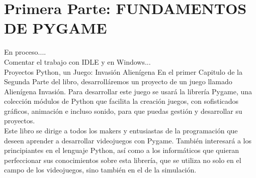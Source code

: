 










\newpage

\setcounter{page}{1}
\pagestyle{plain}




\chapter*{Primera Parte:  FUNDAMENTOS DE PYGAME}%

En proceso....
\\
Comentar el trabajo con IDLE y en Windows...\\





Proyectos  Python, un Juego: Invasión Alienígena
En el primer Capitulo de la Segunda Parte del libro, desarrolláremos  un proyecto de un juego llamado Alienígena Invasión.
Para desarrollar este juego se usará la librería {\ttfamily Pygame}, una colección módulos de Python que facilita la creación juegos,  con sofisticados gráficos, animación e incluso sonido, para que puedas gestión y desarrollar su proyectos.\\
 

Este libro se dirige a todos los makers y entusiastas de la programación que deseen aprender a desarrollar videojuegos con Pygame. También interesará a los principiantes en el lenguaje Python, así como a los informáticos que quieran perfeccionar sus conocimientos sobre esta librería, que se utiliza no solo en el campo de los videojuegos, sino también en el de la simulación.


